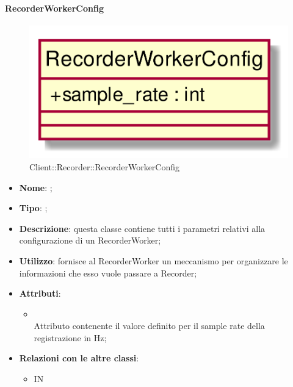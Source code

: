 \hypertarget{RecorderWorkerConfig_label}{\paragraph{RecorderWorkerConfig}}
\begin{figure}[h]
	\centering
	\includegraphics[width=\textwidth,height=\textheight,keepaspectratio]{images/ClassRecorderWorkerConfig.png}
	\caption{Client::Recorder::RecorderWorkerConfig}
\end{figure}
\begin{itemize}
	\item \textbf{Nome}: ;
	\item \textbf{Tipo}: ;
	\item \textbf{Descrizione}: questa classe contiene tutti i parametri relativi alla configurazione di un RecorderWorker;
	\item \textbf{Utilizzo}: fornisce al RecorderWorker un meccanismo per organizzare le informazioni che esso vuole passare a Recorder;
	\item \textbf{Attributi}:
	\begin{itemize}
		\item[]  \\
		Attributo contenente il valore definito per il sample rate della registrazione in Hz;
	\end{itemize}
	\item \textbf{Relazioni con le altre classi}:
	\begin{itemize}
		\item IN \hyperlink{RecorderWorker_label}{}
	\end{itemize}
\end{itemize}
\FloatBarrier

